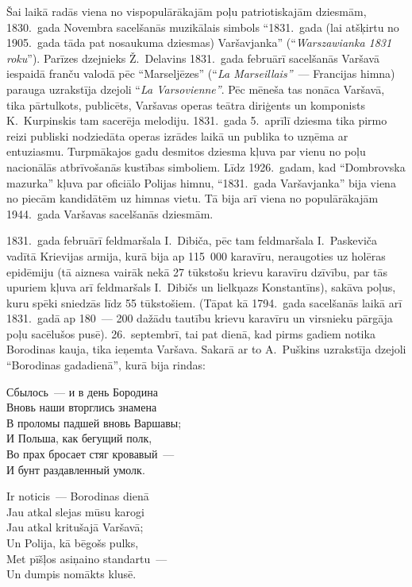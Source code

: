 \documentclass[twoside,a5paper,12pt,fleqn,openany]{extbook}
\newcommand{\pltxti}[1]{\textit{\textpolish{#1}}}
\newcommand{\rutxti}[1]{\textrussian{#1}}
\newcommand{\frtxti}[1]{\textit{\textfrench{#1}}}
\begin{document}
Šai laikā radās viena no vispopulārākajām poļu patriotiskajām dziesmām, 1830.~gada Novembra sacelšanās muzikālais simbols ``1831.~gada (lai atšķirtu no 1905.~gada tāda pat nosaukuma dziesmas) Varšavjanka'' (``\pltxti{Warszawianka 1831 roku}''). Parīzes dzejnieks Ž.~Delavins 1831.~gada februārī sacelšanās Varšavā iespaidā franču valodā pēc ``Marseljēzes'' (``\frtxti{La Marseillais''}~--- Francijas himna) parauga uzrakstīja dzejoli ``\frtxti{La Varsovienne''}. Pēc mēneša tas nonāca Varšavā, tika pārtulkots, publicēts, Varšavas operas teātra diriģents un komponists K.~Kurpinskis tam sacerēja melodiju. 1831.~gada 5.~aprīlī dziesma tika pirmo reizi publiski nodziedāta operas izrādes laikā un publika to uzņēma ar entuziasmu. Turpmākajos gadu desmitos dziesma kļuva par vienu no poļu nacionālās atbrīvošanās kustības simboliem. Līdz 1926.~gadam, kad ``Dombrovska mazurka'' kļuva par oficiālo Polijas himnu, ``1831.~gada Varšavjanka'' bija viena no piecām kandidātēm uz himnas vietu. Tā bija arī viena no populārākajām 1944.~gada Varšavas sacelšanās dziesmām.

1831.~gada februārī feldmaršala I.~Dibiča, pēc tam feldmaršala I.~Paskeviča vadītā Krievijas armija, kurā bija ap 115~000 karavīru, neraugoties uz holēras epidēmiju (tā aiznesa vairāk nekā 27 tūkstošu krievu karavīru dzīvību, par tās upuriem kļuva arī feldmaršals I.~Dibičs un lielkņazs Konstantīns), sakāva poļus, kuru spēki sniedzās līdz 55 tūkstošiem. (Tāpat kā 1794.~gada sacelšanās laikā arī 1831.~gadā ap 180~--- 200 dažādu tautību krievu karavīru un virsnieku pārgāja poļu sacēlušos pusē). 26.~septembrī, tai pat dienā, kad pirms gadiem notika Borodinas kauja, tika ieņemta Varšava. Sakarā ar to A.~Puškins uzrakstīja dzejoli ``Borodinas gadadienā'', kurā bija rindas:

\vspace{1.5em}

\noindent
\begin{minipage}{0.55\textwidth}
\rutxti{
Сбылось~--- и в день Бородина\\
Вновь наши вторглись знамена\\
В проломы падшей вновь Варшавы;\\
И Польша, как бегущий полк,\\
Во прах бросает стяг кровавый~---\\
И бунт раздавленный умолк.}
\end{minipage}
\hspace{1em}
\begin{minipage}{0.5\textwidth}
Ir noticis~--- Borodinas dienā\\
Jau atkal slejas mūsu karogi\\
Jau atkal kritušajā Varšavā;\\
Un Polija, kā bēgošs pulks,\\
Met pīšļos asiņaino standartu~---\\
Un dumpis nomākts klusē.
\end{minipage}
\end{document}
